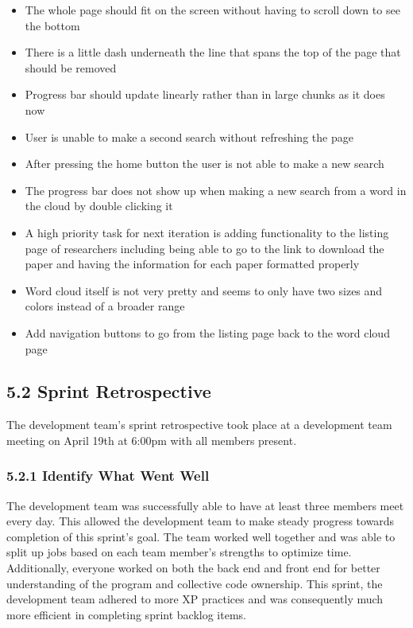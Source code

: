\documentclass[]{article}
\begin{document}
\begin{itemize}
\itemsep1pt\parskip0pt
\item
  The whole page should fit on the screen without having to scroll down
  to see the bottom
\item
  There is a little dash underneath the line that spans the top of the
  page that should be removed
\item
  Progress bar should update linearly rather than in large chunks as it
  does now
\item
  User is unable to make a second search without refreshing the page
\item
  After pressing the home button the user is not able to make a new
  search
\item
  The progress bar does not show up when making a new search from a word
  in the cloud by double clicking it
\item
  A high priority task for next iteration is adding functionality to the
  listing page of researchers including being able to go to the link to
  download the paper and having the information for each paper formatted
  properly
\item
  Word cloud itself is not very pretty and seems to only have two sizes
  and colors instead of a broader range
\item
  Add navigation buttons to go from the listing page back to the word
  cloud page
\end{itemize}

\subsection{5.2 Sprint Retrospective}\label{sprint-retrospective}

The development team's sprint retrospective took place at a development
team meeting on April 19th at 6:00pm with all members present.

\subsubsection{5.2.1 Identify What Went
Well}\label{identify-what-went-well}

The development team was successfully able to have at least three
members meet every day. This allowed the development team to make steady
progress towards completion of this sprint's goal. The team worked well
together and was able to split up jobs based on each team member's
strengths to optimize time. Additionally, everyone worked on both the
back end and front end for better understanding of the program and
collective code ownership. This sprint, the development team adhered to
more XP practices and was consequently much more efficient in completing
sprint backlog items.
\end{document}
